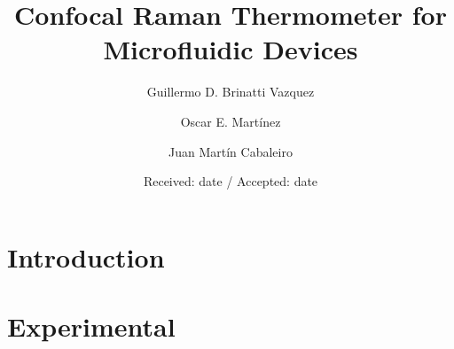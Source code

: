\documentclass[twocolumn]{svjour3}       %
\begin{document}
\title{Confocal Raman Thermometer for Microfluidic Devices}



\author{Guillermo D. Brinatti Vazquez         \and
        Oscar E. Mart\'{i}nez \and
        Juan Mart\'{i}n Cabaleiro %
}



\date{Received: date / Accepted: date}


\maketitle

\begin{abstract}
\end{abstract}

\section{Introduction}

\section{Experimental}
\end{document}
